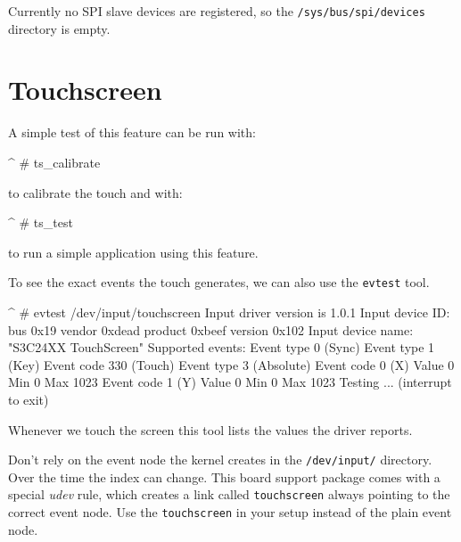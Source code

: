 \begin{important}
Currently no SPI slave devices are registered, so the
\texttt{/sys/bus/spi/devices} directory is empty.
\end{important}

%
%


\section{Touchscreen}					\label{sec:TOUCH}

A simple test of this feature can be run with:

\begin{ptxshell}[escapechar=|]{^}
# ts_calibrate
\end{ptxshell}

to calibrate the touch and with:

\begin{ptxshell}[escapechar=|]{^}
# ts_test
\end{ptxshell}

to run a simple application using this feature.

To see the exact events the touch generates, we can also use the
\texttt{evtest} tool.

\begin{ptxshell}[escapechar=|]{^}
# evtest /dev/input/touchscreen
Input driver version is 1.0.1
Input device ID: bus 0x19 vendor 0xdead product 0xbeef version 0x102
Input device name: "S3C24XX TouchScreen"
Supported events:
  Event type 0 (Sync)
  Event type 1 (Key)
    Event code 330 (Touch)
  Event type 3 (Absolute)
    Event code 0 (X)
     Value      0
     Min        0
     Max     1023
  Event code 1 (Y)
     Value      0
     Min        0
     Max     1023
Testing ... (interrupt to exit)
\end{ptxshell}

Whenever we touch the screen this tool lists the values the driver reports.

\begin{important}
Don't rely on the event node the kernel creates in the \texttt{/dev/input/}
directory. Over the time the index can change. This board support package comes
with a special \textit{udev} rule, which creates a link called \texttt{touchscreen}
always pointing to the correct event node. Use the \texttt{touchscreen} in your
setup instead of the plain event node.
\end{important}

